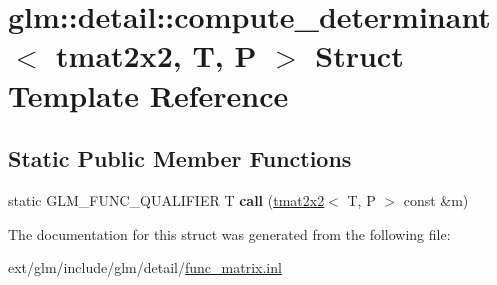 \hypertarget{structglm_1_1detail_1_1compute__determinant_3_01tmat2x2_00_01_t_00_01_p_01_4}{\section{glm\-:\-:detail\-:\-:compute\-\_\-determinant$<$ tmat2x2, T, P $>$ Struct Template Reference}
\label{structglm_1_1detail_1_1compute__determinant_3_01tmat2x2_00_01_t_00_01_p_01_4}
}
\subsection*{Static Public Member Functions}
\begin{DoxyCompactItemize}
\item 
\hypertarget{structglm_1_1detail_1_1compute__determinant_3_01tmat2x2_00_01_t_00_01_p_01_4_a515be152fcac2d176e8209df4fb04971}{static G\-L\-M\-\_\-\-F\-U\-N\-C\-\_\-\-Q\-U\-A\-L\-I\-F\-I\-E\-R T {\bfseries call} (\hyperlink{structglm_1_1tmat2x2}{tmat2x2}$<$ T, P $>$ const \&m)}\label{structglm_1_1detail_1_1compute__determinant_3_01tmat2x2_00_01_t_00_01_p_01_4_a515be152fcac2d176e8209df4fb04971}

\end{DoxyCompactItemize}


The documentation for this struct was generated from the following file\-:\begin{DoxyCompactItemize}
\item 
ext/glm/include/glm/detail/\hyperlink{func__matrix_8inl}{func\-\_\-matrix.\-inl}\end{DoxyCompactItemize}
